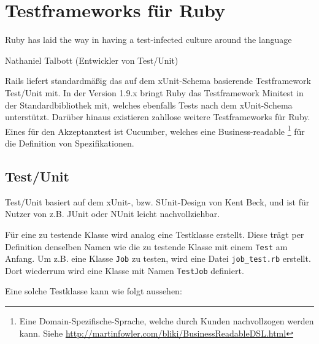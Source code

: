 
\section{Testframeworks für Ruby}
\epigraph{Ruby has laid the way in having a test-infected culture around the language}{Nathaniel Talbott (Entwickler von Test/Unit)}

Rails liefert standardmäßig das auf dem xUnit-Schema basierende Testframework Test/Unit mit. In der Version 1.9.x bringt Ruby das Testframework Minitest in der Standardbibliothek mit, welches ebenfalls Tests nach dem xUnit-Schema unterstützt. Darüber hinaus existieren zahllose weitere Testframeworks für Ruby. Eines für den Akzeptanztest ist Cucumber, welches eine Business-readable \footnote{Eine Domain-Spezifische-Sprache, welche durch Kunden nachvollzogen werden kann. Siehe \url{http://martinfowler.com/bliki/BusinessReadableDSL.html}} für die Definition von Spezifikationen.
\subsection{Test/Unit}
Test/Unit basiert auf dem xUnit-, bzw. SUnit-Design von Kent Beck, und ist für Nutzer von z.B. JUnit oder NUnit leicht nachvollziehbar. 

Für eine zu testende Klasse wird analog eine Testklasse erstellt. Diese trägt per Definition denselben Namen wie die zu testende Klasse mit einem \texttt{Test} am Anfang. Um z.B. eine Klasse \texttt{Job} zu testen, wird eine Datei \texttt{job\_test.rb}  erstellt. Dort wiederrum wird eine Klasse mit Namen \texttt{TestJob} definiert. 


Eine solche Testklasse kann wie folgt aussehen:
\begin{ruby}[label=Testen mit Test/Unit]
 

   
   
      
  
   
  
   
       
     
    
       
\end{ruby}


